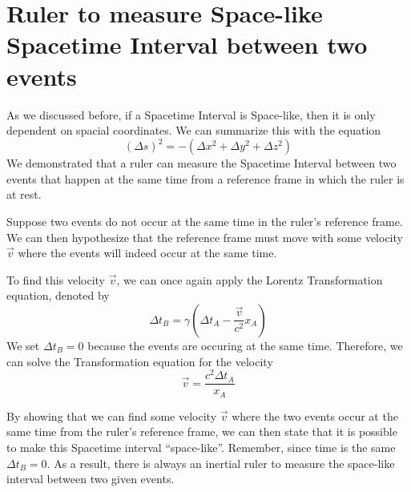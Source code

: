 \documentclass{article}
\begin{document}
\section{Ruler to measure Space-like Spacetime Interval between two events}
As we discussed before, if a Spacetime Interval is Space-like, then it is only dependent on spacial coordinates. We can summarize this with the equation
\[
  (\Delta s)^2 = -(\Delta x^2 + \Delta y^2 + \Delta z^2)
\]
We demonstrated that a ruler can measure the Spacetime Interval between two events that happen at the same time from a reference frame in which the ruler is at rest.

Suppose two events do not occur at the same time in the ruler's reference frame. We can then hypothesize that the reference frame must move with some velocity \(\vec{v}\) where the events will indeed occur at the same time.

To find this velocity \(\vec{v}\), we can once again apply the Lorentz Transformation equation, denoted by
\[
  \Delta t_B = \gamma (\Delta t_A - \frac{\vec{v}}{c^2} x_A)
\]
We set \(\Delta t_B = 0\) because the events are occuring at the same time. Therefore, we can solve the Transformation equation for the velocity
\[
  \vec{v} = \frac{c^2 \Delta t_A}{x_A}
\]

By showing that we can find some velocity \(\vec{v}\) where the two events occur at the same time from the ruler's reference frame, we can then state that it is possible to make this Spacetime interval ``space-like''. Remember, since time is the same \(\Delta t_B = 0\). As a result, there is always an inertial ruler to measure the space-like interval between two given events.
\newpage
\end{document}
